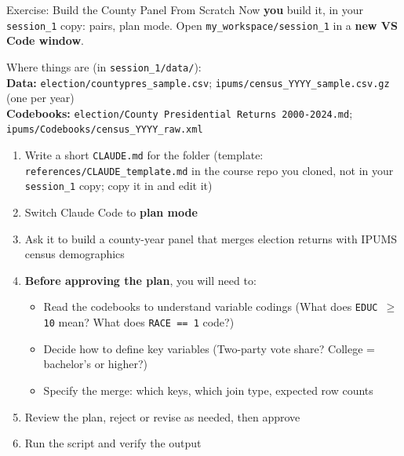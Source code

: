 \documentclass[aspectratio=169, 11pt]{beamer}
\begin{document}

\begin{frame}{Exercise: Build the County Panel From Scratch}
  \small
  Now \textbf{you} build it, in your \texttt{session\_1} copy: pairs, plan mode. Open \texttt{my\_workspace/session\_1} in a \textbf{new VS Code window}.

  \vspace{0.1em}
  {\footnotesize \alert{Where things are} (in \texttt{session\_1/data/}):\\
  \textbf{Data:} \texttt{election/countypres\_sample.csv}; \texttt{ipums/census\_YYYY\_sample.csv.gz} (one per year)\\
  \textbf{Codebooks:} \texttt{election/County Presidential Returns 2000-2024.md}; \texttt{ipums/Codebooks/census\_YYYY\_raw.xml}}

  \vspace{0.3em}
  \begin{enumerate}
    \item Write a short \texttt{CLAUDE.md} for the folder {\footnotesize (template: \texttt{references/CLAUDE\_template.md} in the course repo you cloned, not in your \texttt{session\_1} copy; copy it in and edit it)}
    \item Switch Claude Code to \textbf{plan mode}
    \item Ask it to build a county-year panel that merges election returns with IPUMS census demographics
    \item \textbf{Before approving the plan}, you will need to:
      \begin{itemize}
        \footnotesize
        \item Read the codebooks to understand variable codings (What does \texttt{EDUC $\geq$ 10} mean? What does \texttt{RACE == 1} code?)
        \item Decide how to define key variables (Two-party vote share? College = bachelor's or higher?)
        \item Specify the merge: which keys, which join type, expected row counts
      \end{itemize}
    \item Review the plan, reject or revise as needed, then approve
    \item Run the script and verify the output
  \end{enumerate}
\end{frame}
\end{document}
